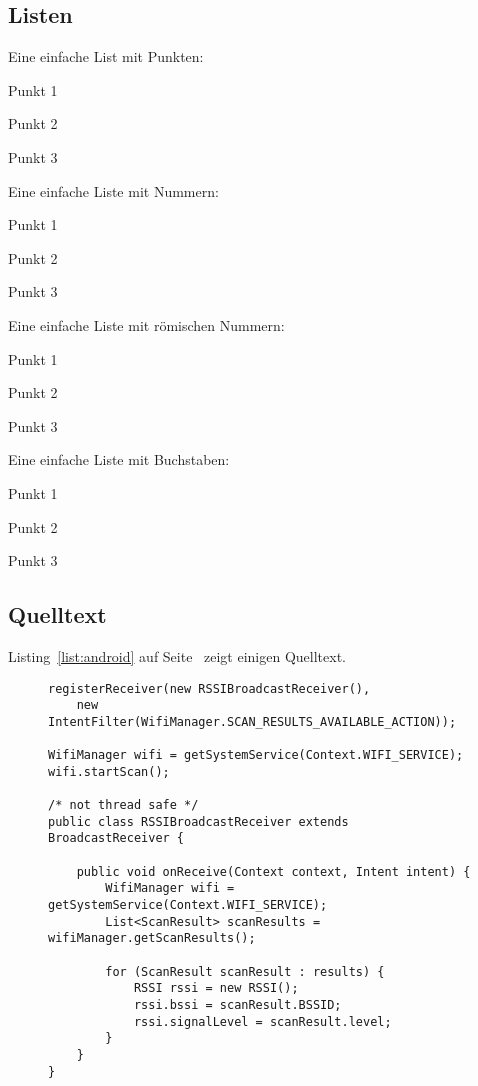 \subsection{Listen}
\label{sec:Listen}
Eine einfache List mit Punkten:

\begin{compactitem}
	\item Punkt 1
	\item Punkt 2
	\item Punkt 3
\end{compactitem}

Eine einfache Liste mit Nummern:
\begin{compactenum}
	\item Punkt 1
	\item Punkt 2 
	\item Punkt 3
\end{compactenum}

Eine einfache Liste mit römischen Nummern:
\begin{compactenum}[I.]
	\item Punkt 1
	\item Punkt 2
	\item Punkt 3
\end{compactenum}

Eine einfache Liste mit Buchstaben:
\begin{compactenum}[(a)]
	\item Punkt 1
	\item Punkt 2 
	\item Punkt 3
\end{compactenum}

\subsection{Quelltext}

Listing~\ref{list:android} auf Seite~\pageref{list:android} zeigt einigen Quelltext.

\begin{figure}[bht]
\begin{lstlisting}[caption=Scanning for Wi-Fi Access Points on Android, label=list:android]
registerReceiver(new RSSIBroadcastReceiver(), 
    new IntentFilter(WifiManager.SCAN_RESULTS_AVAILABLE_ACTION));

WifiManager wifi = getSystemService(Context.WIFI_SERVICE);
wifi.startScan();

/* not thread safe */
public class RSSIBroadcastReceiver extends BroadcastReceiver {

    public void onReceive(Context context, Intent intent) {
        WifiManager wifi = getSystemService(Context.WIFI_SERVICE);
        List<ScanResult> scanResults = wifiManager.getScanResults();

        for (ScanResult scanResult : results) {
            RSSI rssi = new RSSI();
            rssi.bssi = scanResult.BSSID;
            rssi.signalLevel = scanResult.level;
        }
    }
}
\end{lstlisting}
\end{figure}
